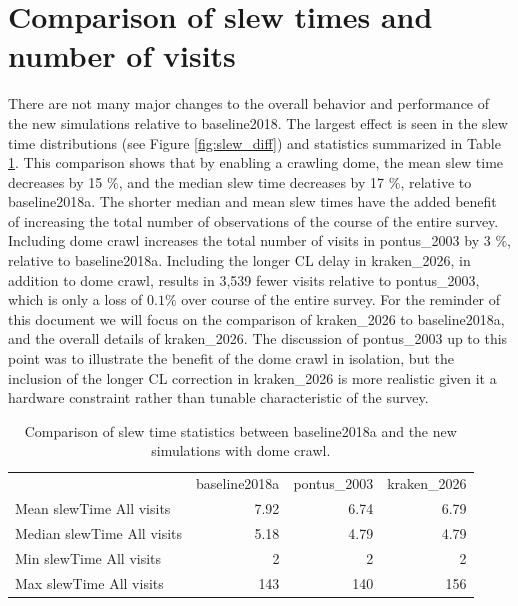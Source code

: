 \documentclass[DM,authoryear,toc]{lsstdoc}
\begin{document}
\section{Comparison of slew times and number of visits}

There are not many major changes to the overall behavior and performance of the new simulations
relative to baseline2018. The largest effect is seen in the slew time distributions (see Figure \ref{fig:slew_diff}) and statistics summarized in
Table \ref{tab:slewtime-comparison}. This comparison shows that by enabling a crawling dome, the mean
slew time decreases by 15 $\%$, and the median slew time decreases by 17 $\%$, relative to baseline2018a.
The shorter median and mean slew times have the added benefit of increasing the total number of
observations of the course of the entire survey. Including dome crawl increases the total number of visits in
pontus\_2003 by 3 $\%$, relative to baseline2018a. Including the longer CL delay in kraken\_2026, in addition to
dome crawl, results in 3,539 fewer visits relative to pontus\_2003, which is only a loss of $0.1\%$ over course of the
entire survey. For the reminder of this document we will focus on the comparison of kraken\_2026
to baseline2018a, and the overall details of kraken\_2026. The discussion of pontus\_2003 up to this point was to
illustrate the benefit of the dome crawl in isolation, but the inclusion of the longer CL correction in kraken\_2026 is
more realistic given it a hardware constraint rather than tunable characteristic of the survey.

\begin{table}[htp]
\caption{Comparison of slew time statistics between baseline2018a and the new simulations with dome crawl.}
\begin{center}
\small
\begin{tabular}{lrrr}
\toprule
{}                                         &   baseline2018a  &   pontus\_2003  &  kraken\_2026 \\
 Mean slewTime All visits    &           7.92          &         6.74          & 6.79               \\
 Median slewTime All visits &          5.18           &        4.79           & 4.79               \\
 Min slewTime All visits       &           2               &         2               & 2                     \\
 Max slewTime All visits      &         143             &       140             & 156                 \\

\bottomrule
\end{tabular}
\end{center}
\label{tab:slewtime-comparison}
\end{table}
\end{document}
